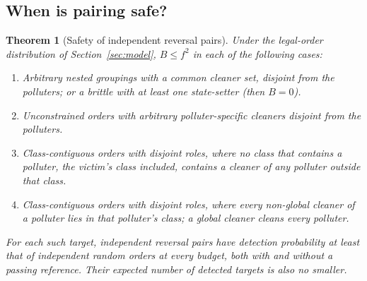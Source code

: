 \documentclass[conference,letterpaper]{IEEEtran}
\newtheorem{theorem}{Theorem}
\theoremstyle{definition}
\begin{document}
\subsection{When is pairing safe?}
\begin{theorem}[Safety of independent reversal pairs]\label{thm:cov}\label{thm:flat}\label{thm:onesided}\label{thm:globallocal}
Under the legal-order distribution of Section~\ref{sec:model}, $B\le f^2$ in each of the following cases:
\begin{enumerate}
\item[(a)] Arbitrary nested groupings with a common cleaner set, disjoint from the polluters; or a brittle with at least one state-setter (then $B=0$).
\item[(b)] Unconstrained orders with arbitrary polluter-specific cleaners disjoint from the polluters.
\item[(c)] Class-contiguous orders with disjoint roles, where no class that contains a polluter, the victim's class included, contains a cleaner of any polluter outside that class.
\item[(d)] Class-contiguous orders with disjoint roles, where every non-global cleaner of a polluter lies in that polluter's class; a global cleaner cleans every polluter.
\end{enumerate}
For each such target, independent reversal pairs have detection probability at least that of independent random orders at every budget, both with and without a passing reference. Their expected number of detected targets is also no smaller.
\end{theorem}
\end{document}
